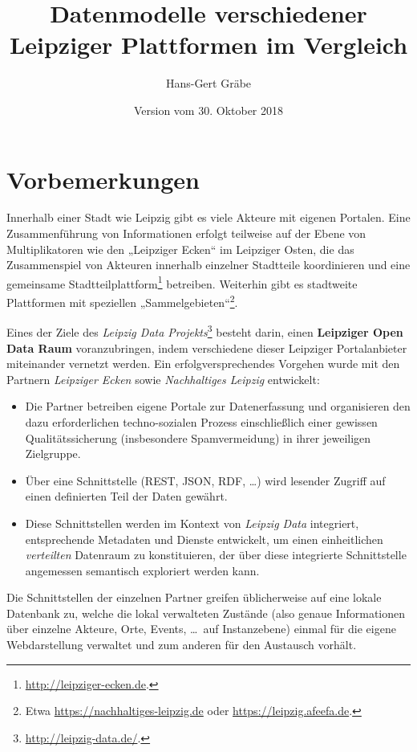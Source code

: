 \documentclass[a4paper,11pt]{article}
\title{Datenmodelle verschiedener\\ Leipziger Plattformen im Vergleich}
\author{Hans-Gert Gräbe}
\date{Version vom 30. Oktober 2018}
\begin{document}
\maketitle
\tableofcontents 
\newpage

\section{Vorbemerkungen}

Innerhalb einer Stadt wie Leipzig gibt es viele Akteure mit eigenen Portalen.
Eine Zusammenführung von Informationen erfolgt teilweise auf der Ebene von
Multiplikatoren wie den „Leipziger Ecken“ im Leipziger Osten, die das
Zusammenspiel von Akteuren innerhalb einzelner Stadtteile koordinieren und
eine gemeinsame Stadtteilplattform\footnote{\url{http://leipziger-ecken.de}.}
betreiben.  Weiterhin gibt es stadtweite Plattformen mit speziellen
„Sammelgebieten“\footnote{Etwa \url{https://nachhaltiges-leipzig.de} oder
\url{https://leipzig.afeefa.de}.}.

Eines der Ziele des \emph{Leipzig Data
  Projekts}\footnote{\url{http://leipzig-data.de/}.} besteht darin, einen
\textbf{Leipziger Open Data Raum} voranzubringen, indem verschiedene dieser
Leipziger Portalanbieter miteinander vernetzt werden. Ein erfolgversprechendes
Vorgehen wurde mit den Partnern \emph{Leipziger Ecken} sowie
\emph{Nachhaltiges Leipzig} entwickelt:
\begin{itemize}
\item [1)] Die Partner betreiben eigene Portale zur Datenerfassung und
  organisieren den dazu erforderlichen techno-sozialen Prozess einschließlich
  einer gewissen Qualitätssicherung (insbesondere Spamvermeidung) in ihrer
  jeweiligen Zielgruppe. 
\item [2)] Über eine Schnittstelle (REST, JSON, RDF, \ldots) wird lesender
  Zugriff auf einen definierten Teil der Daten gewährt.
\item [3)] Diese Schnittstellen werden im Kontext von \emph{Leipzig Data}
  integriert, entsprechende Metadaten und Dienste entwickelt, um einen
  einheitlichen \emph{verteilten} Datenraum zu konstituieren, der über diese
  integrierte Schnittstelle angemessen semantisch exploriert werden kann. 
\end{itemize}
Die Schnittstellen der einzelnen Partner greifen üblicherweise auf eine lokale
Datenbank zu, welche die lokal verwalteten Zustände (also genaue Informationen
über einzelne Akteure, Orte, Events, \ldots\ auf Instanzebene) einmal für die
eigene Webdarstellung verwaltet und zum anderen für den Austausch vorhält. 
\end{document}
